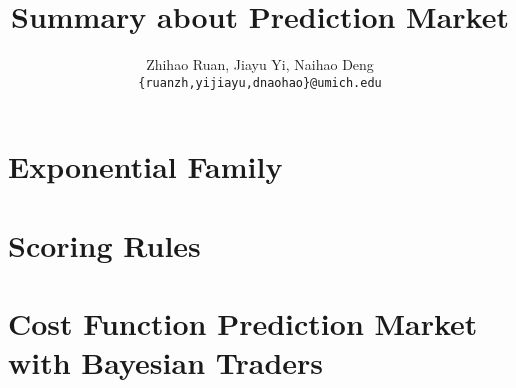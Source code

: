 \documentclass[12pt]{article}
\title{\textbf{Summary about Prediction Market}}
\author{Zhihao Ruan, Jiayu Yi, Naihao Deng\\\texttt{\{ruanzh,yijiayu,dnaohao\}@umich.edu}}
\begin{document}
\maketitle
\tableofcontents


\newpage
\section{Exponential Family}

\newpage
\section{Scoring Rules}

\newpage
\section{Cost Function Prediction Market with Bayesian Traders}
\end{document}
